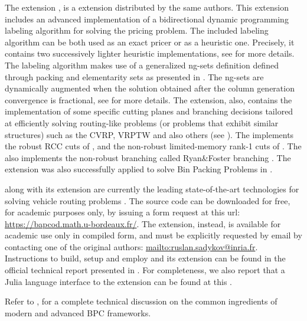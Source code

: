 The \vrpsolver{} extension \parencite{pessoa2020generic}, is
a \bapcod{} extension distributed by the same authors.
This extension includes an
advanced implementation of a bidirectional dynamic programming labeling algorithm
\parencite{sadykov2021bucket} for solving the pricing problem.
The included labeling algorithm
can be both used as an exact pricer or as a heuristic one.
Precisely, it contains two successively lighter heuristic implementations,
see \textcite{sadykov2021bucket} for more details.
The labeling algorithm makes use of a generalized ng-sets definition \parencite{baldacci2011}
defined through packing and elementarity sets as presented in \textcite{pessoa2020generic}.
The ng-sets are dynamically augmented \parencite{roberti2014}
when the solution obtained after the column generation convergence
is fractional,
see \textcite{pessoa2020generic} for more details.
The \vrpsolver{} extension, also,
contains the implementation of some
specific cutting planes and branching decisions
tailored at efficiently solving routing-like problems
(or problems that exhibit similar structures)
such as the CVRP, VRPTW and also others (see \cite{pessoa2020generic}).
The \vrpsolver{} implements the robust RCC cuts of \textcite{laporte1983},
and the non-robust limited-memory rank-1 cuts of \textcite{pecin2017improved}.
The \vrpsolver{} also implements the non-robust branching called Ryan\&Foster branching \parencite{ryan1981integer}.
The \vrpsolver{} extension was also successfully applied
to solve Bin Packing Problems in \textcite{pessoa2020}.

\medskip

\bapcod{} along with its \vrpsolver{} extension are currently the leading state-of-the-art
technologies for solving vehicle routing problems \parencite{pessoa2020generic}.
The \bapcod{} source code can be downloaded for free, for academic purposes only,
by issuing a form request at this url: \url{https://bapcod.math.u-bordeaux.fr/}.
The \vrpsolver{} extension, instead, is available for academic use only in compiled form,
and must be explicitly requested by email by contacting one of the
original authors: \url{mailto:ruslan.sadykov@inria.fr}.
Instructions to build, setup and employ \bapcod{} and its \vrpsolver{} extension
can be found in the official technical report presented in \textcite{sadykov2021}.
For completeness, we also report that
a Julia language interface to the \vrpsolver{} extension
can be found at this
.

Refer to \textcite{sadykov2019modern},
for a complete technical discussion on the common ingredients of modern and advanced BPC frameworks.

